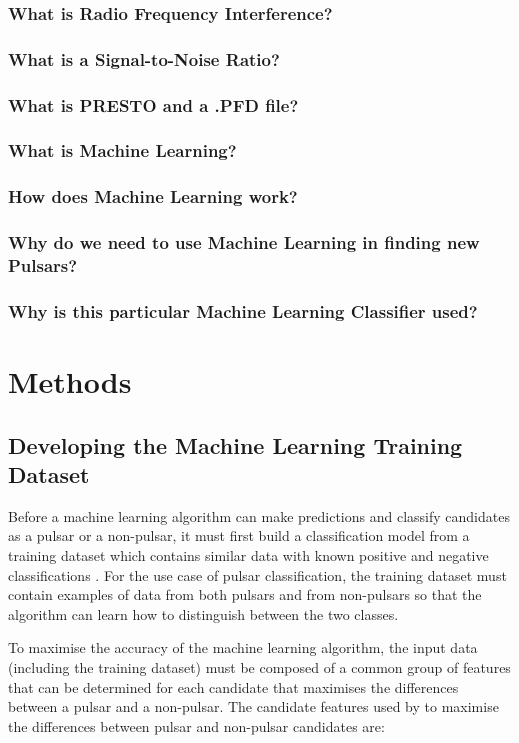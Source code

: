 \documentclass{article}
\begin{document}
\subsubsection{What is Radio Frequency Interference?}
\subsubsection{What is a Signal-to-Noise Ratio?}
\subsubsection{What is PRESTO and a .PFD file?}
\subsubsection{What is Machine Learning?}
\subsubsection{How does Machine Learning work?}
\subsubsection{Why do we need to use Machine Learning in finding new Pulsars?}
\subsubsection{Why is this particular Machine Learning Classifier used?}


\pagebreak
\section{Methods}
\subsection{Developing the Machine Learning Training Dataset}

Before a machine learning algorithm can make predictions and classify candidates as a pulsar or a non-pulsar, it must first build a classification model from a training dataset which contains similar data with known positive and negative classifications \autocite{tan, lyon}. For the use case of pulsar classification, the training dataset must contain examples of data from both pulsars and from non-pulsars so that the algorithm can learn how to distinguish between the two classes.

To maximise the accuracy of the machine learning algorithm, the input data (including the training dataset) must be composed of a common group of features that can be determined for each candidate that maximises the differences between a pulsar and a non-pulsar. The candidate features used by \textcite{tan} to maximise the differences between pulsar and non-pulsar candidates are:
\end{document}
